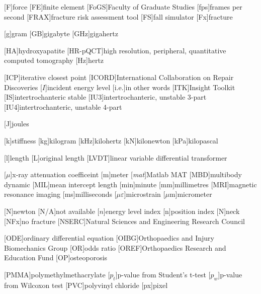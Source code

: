 \begin{acronym}[HR-pQCT]
[F]{force}
[FE]{finite element}
[FoGS]{Faculty of Graduate Studies}
[fps]{frames per second}
[FRAX\textsuperscript{\textregistered}]{fracture risk assessment tool}
[FS]{fall simulator}
[Fx]{fracture}

[g]{gram}
[GB]{gigabyte}
[GHz]{gigahertz}

[HA]{hydroxyapatite}
[HR-pQCT]{high resolution, peripheral, quantitative computed tomography}
[Hz]{hertz}

[ICP]{iterative closest point}
[ICORD]{International Collaboration on Repair Discoveries}
[$I$]{incident energy level}
[i.e.]{in other words}
[ITK]{Insight Toolkit}
[IS]{inter\-tro\-chan\-teric stable}
[IU3]{inter\-tro\-chan\-teric, unstable 3-part}
[IU4]{inter\-tro\-chan\-teric, unstable 4-part}

[J]{joules}

[k]{stiffness}
[kg]{kilogram}
[kHz]{kilohertz}
[kN]{kilonewton}
[kPa]{kilopascal}

[l]{length}
[L]{original length}
[LVDT]{linear variable differential transformer}

[$\mu$]{x-ray attenuation coefficeint}
[m]{meter}
[\textit{mat}]{Matlab MAT}
[MBD]{multibody dynamic}
[MIL]{mean intercept length}
[min]{minute}
[mm]{millimetres}
[MRI]{magnetic resonance imaging}
[ms]{milliseconds}
[$\mu\varepsilon$]{microstrain}
[$\mu$m]{micrometer}

[N]{newton}
[N/A]{not available}
[$n$]{energy level index}
[n]{position index}
[N]{neck}
[NFx]{no fracture}
[NSERC]{Natural Sciences and Engineering Research Council}

[ODE]{ordinary differential equation}
[OIBG]{Orthopaedics and Injury Biomechanics Group}
[OR]{odds ratio}
[OREF]{Orthopaedics Research and Education Fund}
[OP]{osteoporosis}

[PMMA]{polymethylmethacrylate}
[$p_t$]{p-value from Student's t-test}
[$p_w$]{p-value from Wilcoxon test}
[PVC]{polyvinyl chloride}
[px]{pixel}


\end{acronym}
